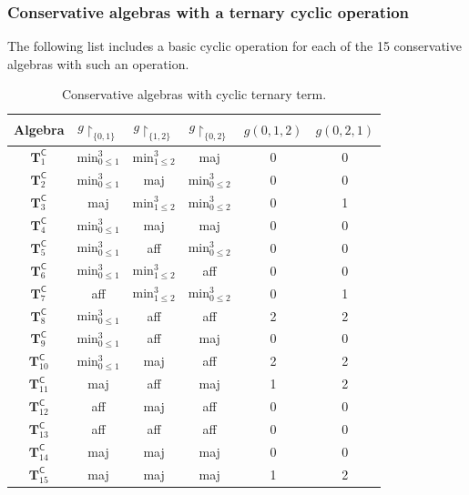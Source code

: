 \documentclass[11pt]{amsart}
\newcommand{\co}{\scriptscriptstyle{\mathsf{C}}}
\theoremstyle{definition}
\theoremstyle{remark}
\theoremstyle{plain}
\def\T{\mathbf{T}}
\begin{document}
\subsubsection*{Conservative algebras with a ternary cyclic operation}
The following list includes a basic cyclic operation for each of the 15 conservative algebras with such an operation. 
\begin{table}[!ht]
\centering
 \begin{tabular}{|c||c|c|c|c|c|}
\hline
    Algebra & $g{\restriction_{\{0,1\}}}$ & $g{\restriction_{\{1,2\}}}$ & $g{\restriction_{\{0,2\}}}$ & $g(0,1,2)$ & $g(0,2,1)$ \\
\hline\hline
     $\T^{\co}_1$  & $\text{min}^3_{0\leqslant 1}$ & $\text{min}^3_{1\leqslant 2}$ & maj & 0 & 0\\
\hline
    $\T^{\co}_2$  & $\text{min}^3_{0\leqslant 1}$ & maj & $\text{min}^3_{0\leqslant 2}$ & 0 & 0\\
\hline
    $\T^{\co}_3$  & maj & $\text{min}^3_{1\leqslant 2}$ & $\text{min}^3_{0\leqslant 2}$ & 0 & 1\\
\hline
    $\T^{\co}_4$  & $\text{min}^3_{0\leqslant 1}$ & maj & maj & 0 & 0\\
\hline
    $\T^{\co}_5$  & $\text{min}^3_{0\leqslant 1}$ & aff & $\text{min}^3_{0\leqslant 2}$ & 0 & 0\\
\hline
    $\T^{\co}_6$  & $\text{min}^3_{0\leqslant 1}$ & $\text{min}^3_{1\leqslant 2}$ & aff & 0 & 0\\
\hline
    $\T^{\co}_7$  & aff & $\text{min}^3_{1\leqslant 2}$ & $\text{min}^3_{0\leqslant 2}$ & 0 & 1\\
\hline
    $\T^{\co}_8$  & $\text{min}^3_{0\leqslant 1}$ & aff & aff & 2 & 2\\
\hline
    $\T^{\co}_9$  & $\text{min}^3_{0\leqslant 1}$ & aff & maj & 0 & 0\\
\hline
    $\T^{\co}_{10}$  & $\text{min}^3_{0\leqslant 1}$ & maj & aff & 2 & 2\\
\hline
    $\T^{\co}_{11}$  & maj & aff & maj & 1 & 2\\
\hline
    $\T^{\co}_{12}$  & aff & maj & aff & 0 & 0\\
\hline
    $\T^{\co}_{13}$  & aff & aff & aff & 0 & 0\\
\hline
    $\T^{\co}_{14}$  & maj & maj & maj & 0 & 0\\
\hline
    $\T^{\co}_{15}$  & maj &  maj & maj & 1 & 2\\
\hline
\end{tabular}  
\caption{Conservative algebras with cyclic ternary term.}
\label{table:4}
\end{table}
\FloatBarrier
\end{document}
